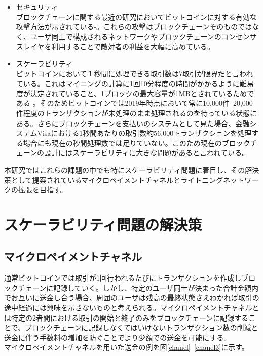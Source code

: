 \documentclass[12pt]{jarticle}
\begin{document}
\begin{itemize}
\item セキュリティ\\
ブロックチェーンに関する最近の研究においてビットコインに対する有効な攻撃方法が示されている\cite{security2}-\cite{security4}。これらの攻撃はブロックチェーンそのものではなく、ユーザ同士で構成されるネットワークやブロックチェーンのコンセンサスレイヤを利用することで敵対者の利益を大幅に高めている。
\item スケーラビリティ\\
ビットコインにおいて１秒間に処理できる取引数は7取引が限界だと言われている。これはマイニングの計算に1回10分程度の時間がかかるように難易度が決定されていること、1ブロックの最大容量が1MBとされているためである
。そのためビットコインでは2019年時点において常に10,000件~20,000件程度のトランザクションが未処理のまま処理されるのを待っている状態にある。さらにブロックチェーンを支払いのシステムとして見た場合、金融システムVisaにおける1秒間あたりの取引数約56,000トランザクションを処理する場合にも現在の秒間処理数では足りていない。このため現在のブロックチェーンの設計にはスケーラビリティに大きな問題があると言われている。

\end{itemize}

本研究ではこれらの課題の中でも特にスケーラビリティ問題に着目し、その解決策として提案されているマイクロペイメントチャネルとライトニングネットワークの拡張を目指す。

\section{スケーラビリティ問題の解決策}
\subsection{マイクロペイメントチャネル}
通常ビットコインでは取引が1回行われるたびにトランザクションを作成しブロックチェーンに記録していく。しかし、特定のユーザ同士が決まった合計金額内でお互いに送金し合う場合、周囲のユーザは残高の最終状態さえわかれば取引の途中経過には興味を示さないものと考えられる。マイクロペイメントチャネルとは特定の2者間における取引の開始と終了のみをブロックチェーンに記録することで、ブロックチェーンに記録しなくてはいけないトランザクション数の削減と送金に伴う手数料の増加を防ぐことでより少額での送金を可能にする。\\
マイクロペイメントチャネルを用いた送金の例を図\ref{chanel}~\ref{chanel3}に示す。
\end{document}
